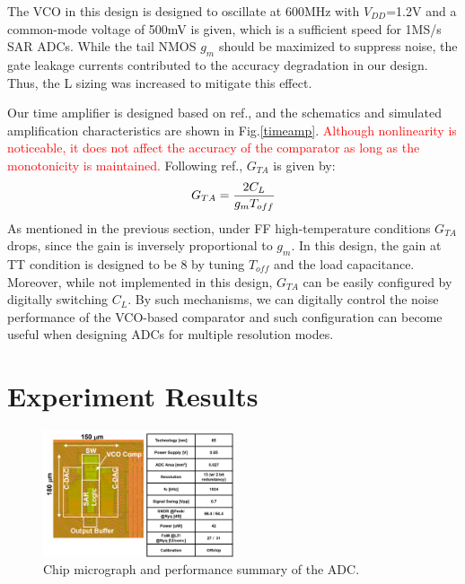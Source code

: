 \documentclass[journal]{IEEEtran}
\begin{document}
The VCO in this design is designed to oscillate at 600MHz with $V_{DD}$=1.2V and a common-mode voltage of 500mV is given, which is a sufficient speed for 1MS/s SAR ADCs. While the tail NMOS $g_m$ should be maximized to suppress noise, the gate leakage currents contributed to the accuracy degradation in our design. Thus, the L sizing was increased to mitigate this effect. 

Our time amplifier is designed based on ref.\cite{lee20089}, and the schematics and simulated amplification characteristics are shown in Fig.\ref{timeamp}. 
\textcolor{red}{Although nonlinearity is noticeable, it does not affect the accuracy of the comparator as long as the monotonicity is maintained.}
Following ref.\cite{lee20089}, $G_{TA}$ is given by:
\begin{eqnarray}
    \centering
    G_{TA} = \frac{2C_L}{g_mT_{off}}
    \label{gta}
\end{eqnarray}
As mentioned in the previous section, under FF high-temperature conditions $G_{TA}$ drops, since the gain is inversely proportional to $g_m$.
In this design, the gain at TT condition is designed to be 8 by tuning $T_{off}$ and the load capacitance. Moreover, while not implemented in this design, $G_{TA}$ can be easily configured by digitally switching $C_L$. By such mechanisms, we can digitally control the noise performance of the VCO-based comparator and such configuration can become useful when designing ADCs for multiple resolution modes\cite{harpe201310b}.

\section{Experiment Results}
\begin{figure}[!t]
\centering
 \includegraphics[width=0.5\textwidth]{figs/chipphoto.png}
  \caption{Chip micrograph and performance summary of the ADC.}
  \label{chipphoto}
\end{figure}
\end{document}
